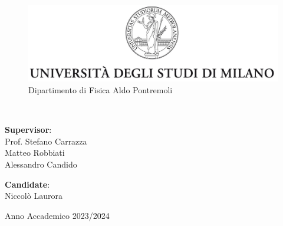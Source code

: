 \begin{titlepage}
\null\vfill
\begin{center}
\large
\sffamily

\begin{figure}
\centering
\includegraphics[width=360pt]{uni.jpg}
Dipartimento di Fisica Aldo Pontremoli
\vspace{0.5 cm}
\end{figure}

\bigskip

{\huge{} \\
}

\end{center}

\bigskip
    
\vspace{9cm}


\begin{flushleft}
\textbf{Supervisor}:\\ Prof. Stefano Carrazza \\ Matteo Robbiati \\ Alessandro Candido
\end{flushleft}
	
\begin{flushright}
\textbf{Candidate}:\\ Niccolò Laurora
\end{flushright}
	
\vfill
\begin{center}
{\large Anno Accademico 2023/2024}
\end{center}

\end{titlepage}